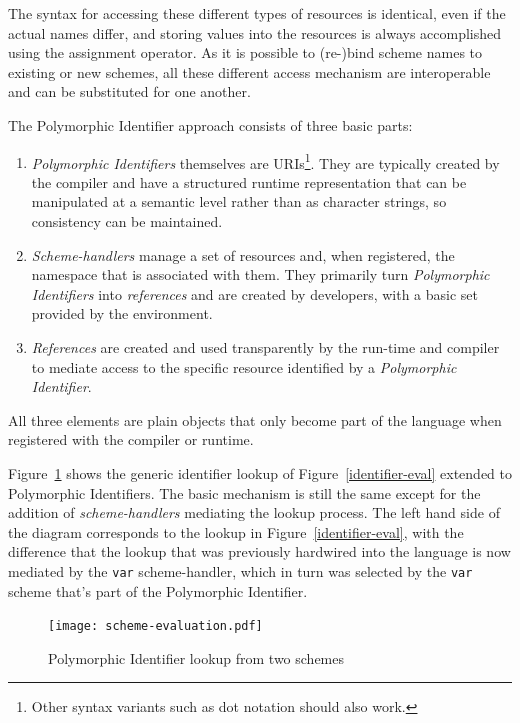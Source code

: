 \documentclass{acm_proc_article-sp}
\begin{document}
The syntax for accessing these different types of resources is identical, even if the actual
names differ, and storing values into the resources is always accomplished using the assignment operator.
As it is possible to (re-)bind scheme names to existing or new schemes, all these different access 
mechanism are interoperable and can be substituted for one another.

The Polymorphic Identifier approach consists of three basic parts:
\begin{enumerate}
\item \emph{Polymorphic Identifiers} themselves are URIs\footnote{Other syntax variants such as dot notation should also work.}.
	  They are typically created by the 
	compiler and have a structured runtime representation that can be manipulated
	at a semantic level rather than as character strings, so consistency can be 
	maintained.
\item \emph{Scheme-handlers} manage a set of resources and, when registered,
	 the namespace that is associated
	with them.  They primarily turn \emph{Polymorphic Identifiers} into \emph{references} and
	are created by developers, with a basic set provided by the environment.
\item \emph{References} are created and used transparently by the run-time and compiler
	to mediate access to the specific resource identified by a \emph{Polymorphic Identifier}.
	
	
\end{enumerate}

All three elements are plain objects that only become part of the language when registered
with the compiler or runtime.

Figure~\ref{scheme-eval} shows the generic identifier lookup of Figure~\ref{identifier-eval}
extended to Polymorphic Identifiers.  The basic mechanism is still the same except for the
addition of \emph{scheme-handlers} mediating the lookup process.  The left hand side of the
diagram corresponds to the lookup in Figure~\ref{identifier-eval}, with the difference that
the lookup that was previously hardwired into the language is now mediated by the {\tt var}
scheme-handler, which in turn was selected by the {\tt var} scheme that's part of the 
Polymorphic Identifier.


\begin{figure}[htbp]
\centering\texttt{[image: scheme-evaluation.pdf]}
\caption{Polymorphic Identifier lookup from two schemes}
\label{scheme-eval}
\end{figure}
\end{document}
